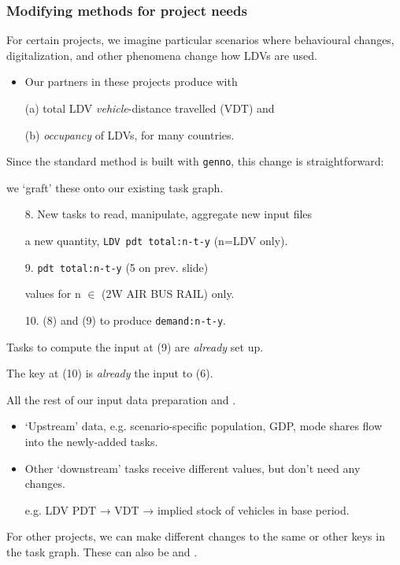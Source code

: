 \documentclass[12pt,aspectratio=169]{beamer}
\renewcommand{\mod}[1]{\texttt{#1}}
\begin{document}
\begin{frame}[allowframebreaks]
\frametitle{Modifying methods for project needs}

For certain projects, we imagine particular scenarios where behavioural changes, digitalization, and other phenomena change how LDVs are used.
\begin{itemize}
  \item Our partners in these projects produce  with

    (a) total LDV \emph{vehicle}-distance travelled (VDT) and

    (b) \emph{occupancy} of LDVs, for many countries.
\end{itemize}

\medskip
Since the standard method is built with \mod{genno}, this change is straightforward:

we ‘graft' these onto our existing task graph.
\begin{enumerate}
  \item [8.] New tasks to read, manipulate, aggregate new input files

     a new quantity, \texttt{LDV pdt total:n-t-y} (n=LDV only).
  \item [9.] \texttt{pdt total:n-t-y} (5 on prev. slide)

     values for n $\in$ (2W AIR BUS RAIL) only.
  \item [10.] (8) and (9)  to produce \texttt{demand:n-t-y}.
\end{enumerate}

\framebreak
Tasks to compute the input at (9) are \emph{already} set up.

The key at (10) is \emph{already} the input to (6).

\medskip
All the rest of our input data preparation  and .
\begin{itemize}
  \item ‘Upstream’ data, e.g. scenario-specific population, GDP, mode shares flow into the newly-added tasks.
  \item Other ‘downstream’ tasks receive different values, but don't need any changes.

    e.g. LDV PDT → VDT → implied stock of vehicles in base period.
\end{itemize}

\medskip

\medskip
For other projects, we can make different changes to the same or other keys in the task graph.
These can also be  and .
\end{frame}
\end{document}
